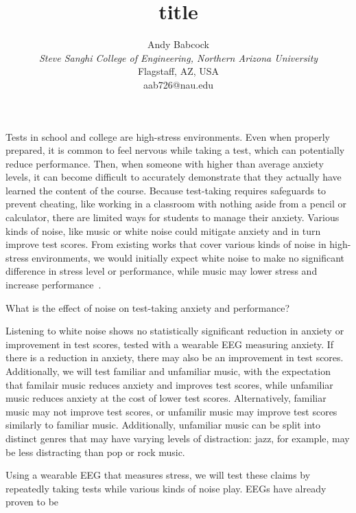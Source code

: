 \documentclass[journal]{IEEEtran}
\begin{document}
\title{title}

\author{Andy Babcock \\
    \textit{Steve Sanghi College of Engineering, Northern Arizona University} \\
    Flagstaff, AZ, USA \\
    aab726@nau.edu
}

\maketitle
Tests in school and college are high-stress environments. Even when properly prepared, it is common to feel nervous while taking a test, which can potentially reduce performance. Then, when someone with higher than average anxiety levels, it can become difficult to accurately demonstrate that they actually have learned the content of the course. Because test-taking requires safeguards to prevent cheating, like working in a classroom with nothing aside from a pencil or calculator, there are limited ways for students to manage their anxiety. Various kinds of noise, like music or white noise could mitigate anxiety and in turn improve test scores. From existing works that cover various kinds of noise in high-stress environments, we would initially expect white noise to make no significant difference in stress level or performance, while music may lower stress and increase performance~\cite{ShahrokhiShabnam2022Teow}.

What is the effect of noise on test-taking anxiety and performance?

Listening to white noise shows no statistically significant reduction in anxiety or improvement in test scores, tested with a wearable EEG measuring anxiety. If there is a reduction in anxiety, there may also be an improvement in test scores. Additionally, we will test familiar and unfamiliar music, with the expectation that familair music reduces anxiety and improves test scores, while unfamiliar music reduces anxiety at the cost of lower test scores. Alternatively, familiar music may not improve test scores, or unfamilir music may improve test scores similarly to familiar music. Additionally, unfamiliar music can be split into distinct genres that may have varying levels of distraction: jazz, for example, may be less distracting than pop or rock music.

Using a wearable EEG that measures stress, we will test these claims by repeatedly taking tests while various kinds of noise play. EEGs have already proven to be 



\end{document}
